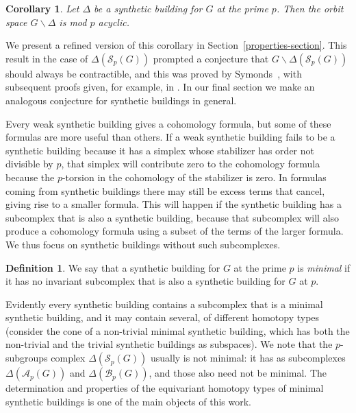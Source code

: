\documentclass[12pt]{amsart}
\theoremstyle{plain}
\newtheorem{corollary}[theorem]{Corollary}
\theoremstyle{definition}
\newtheorem{definition}[theorem]{Definition}
\theoremstyle{remark}
\numberwithin{equation}{section}
\def\calS{{\mathcal S}}
\newcommand{\SpCpx}[2]{\Delta(\mathcal{S}_{#2}(#1))}
\newcommand{\ApCpx}[2]{\Delta(\mathcal{A}_{#2}(#1))}
\newcommand{\BpCpx}[2]{\Delta(\mathcal{B}_{#2}(#1))}
\begin{document}
\begin{corollary}\label{cor:modp}
Let $\Delta$ be a synthetic building for $G$ at the prime $p$. Then the orbit space $G\backslash \Delta$  is mod $p$ acyclic.
\end{corollary}

We present a refined version of this corollary in Section~\ref{properties-section}. This result in the case of $\Delta(\calS_p(G))$ prompted a conjecture that $G\backslash\Delta(\calS_p(G))$ should always be contractible, and this was proved by Symonds~\cite{Sym1998}, with subsequent proofs given, for example, in \cite{Bux1999, Gro2023, Ste2023}. In our final section we make an analogous conjecture for synthetic buildings in general.


Every weak synthetic building gives a cohomology formula, but some of these formulas are more useful than others. If a weak synthetic building fails to be a synthetic building because it has a simplex whose stabilizer has order not divisible by $p$, that simplex will contribute zero to the cohomology formula because the $p$-torsion in the cohomology of the stabilizer is zero. In formulas coming from synthetic buildings there may still be excess terms that cancel, giving rise to a smaller formula. This will happen if the synthetic building has a subcomplex that is also a synthetic building, because that subcomplex will also produce a cohomology formula using a subset of the terms of the larger formula. We thus focus on synthetic buildings without such subcomplexes.

\begin{definition}
We say that a synthetic building for $G$ at the prime $p$ is \textit{minimal} if it has no invariant subcomplex that is also a synthetic building for $G$ at $p$.
\end{definition}

Evidently every synthetic building contains a subcomplex that is a minimal synthetic building, and it may contain several, of different homotopy types (consider the cone of a non-trivial minimal synthetic building, which has both the non-trivial and the trivial synthetic buildings as subspaces). 
We note that the $p$-subgroups complex $\SpCpx{G}{p}$ usually is not minimal: it has as subcomplexes $\ApCpx{G}{p}$ and $\BpCpx{G}{p}$, and those also need not be minimal. The determination and properties of the equivariant homotopy types of minimal synthetic buildings is one of the main objects of this work.
\end{document}
